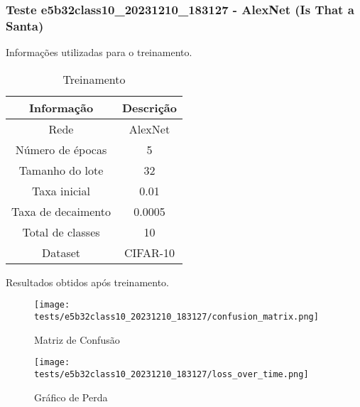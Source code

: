\subsubsection{Teste e5b32class10_20231210_183127 - AlexNet (Is That a Santa)}

Informações utilizadas para o treinamento.

\begin{table}[ht]
   \centering
   \caption{Treinamento}
   \label{tab:modelos}
   \begin{tabular}{| c | c | }
      \hline 
      \textbf{Informação} & \textbf{Descrição} \\
      \hline \hline 
      Rede & AlexNet \\
      \hline
      Número de épocas & 5\\
      \hline
      Tamanho do lote & 32\\
      \hline
      Taxa inicial & 0.01 \\
      \hline
      Taxa de decaimento & 0.0005 \\
      \hline
      Total de classes & 10\\
      \hline
      Dataset & CIFAR-10\\
      \hline
   \end{tabular} 
\end{table}

Resultados obtidos após treinamento.


\begin{figure}[ht]
 \begin{center}
   \texttt{[image: tests/e5b32class10\_20231210\_183127/confusion\_matrix.png]}
  \caption{Matriz de Confusão}
  \label{fig:fig03}
 \end{center}
\end{figure}

\begin{figure}[ht]
 \begin{center}
   \texttt{[image: tests/e5b32class10\_20231210\_183127/loss\_over\_time.png]}
  \caption{Gráfico de Perda}
  \label{fig:fig04}
 \end{center}
\end{figure}
